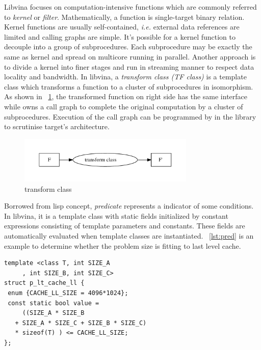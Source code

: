 \documentclass[10pt, conference, compsocconf]{IEEEtran}
\begin{document}
Libvina focuses on computation-intensive functions which are commonly referred to \emph{kernel} or \emph{filter}. Mathematically, a function is single-target binary relation. Kernel functions are usually self-contained, \textit{i.e.} external data references are limited and calling graphs are simple. It's possible for a kernel function to decouple into a group of subprocedures. Each subprocedure may be exactly the same as kernel and spread on multicore running in parallel.  Another approach is to divide a kernel into finer stages and run in streaming manner to respect data locality and bandwidth. In libvina, a \emph{transform class (TF class)} is a template class which transforms a function to a cluster of subprocedures in isomorphism. As shown in ~\ref{fig:tfcls}, the transformed function on right side has the same interface while owns a call graph to complete the original computation by a cluster of subprocedures. Execution of the call graph can be programmed by in the library to scrutinise target's architecture.

\begin{figure}
\centering
\includegraphics[width=3.3in]{map-class}
\caption{transform class}
\label{fig:tfcls}
\end{figure}

Borrowed from lisp concept, \emph{predicate} represents a indicator of some conditions. In libvina, it is a template class with static fields initialized by constant expressions consisting of template parameters and constants. These fields are automatically evaluated when template classes are instantiated. ~\ref{lst:pred} is an example to determine whether the problem size is fitting to last level cache.

\makebox[3.1\width]{\hrulefill}
\begin{verbatim}
template <class T, int SIZE_A
     , int SIZE_B, int SIZE_C>
struct p_lt_cache_ll {
 enum {CACHE_LL_SIZE = 4096*1024};
 const static bool value = 
     ((SIZE_A * SIZE_B 
   + SIZE_A * SIZE_C + SIZE_B * SIZE_C) 
   * sizeof(T) ) <= CACHE_LL_SIZE;
};
\end{verbatim}
\begin{center}
\caption{List - 1 : predicate lt\_cache\_ll}
\label{lst:pred}
\end{center}
\end{document}
